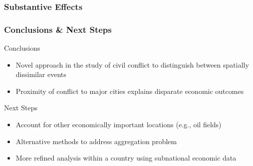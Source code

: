 \begin{frame}
\frametitle{Substantive Effects}

\begin{figure}[ht]
	\centering
	\resizebox{.9\textwidth}{!}{}
\end{figure}

\end{frame}

\begin{frame}
\frametitle{Conclusions \& Next Steps}

\begin{block}{Conclusions}
\begin{itemize}
	\item Novel approach in the study of civil conflict to distinguish between spatially dissimilar events
	\item Proximity of conflict to major cities explains disparate economic outcomes
\end{itemize}
\end{block}

\begin{block}{Next Steps}
\begin{itemize}
\item Account for other economically important locations (e.g., oil fields)
\item Alternative methods to address aggregation problem
\item More refined analysis within a country using subnational economic data
\end{itemize}
\end{block}

\end{frame}

